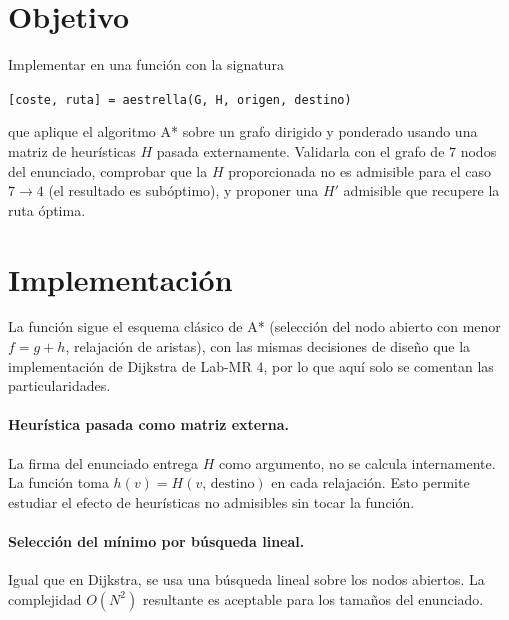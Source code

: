 \section{Objetivo}
Implementar en \matlab{} una funci\'{o}n con la signatura
\begin{center}
  \texttt{[coste, ruta] = aestrella(G, H, origen, destino)}
\end{center}
que aplique el algoritmo A* sobre un grafo dirigido y ponderado usando una matriz de heur\'{i}sticas $H$ pasada externamente. Validarla con el grafo de $7$ nodos del enunciado, comprobar que la $H$ proporcionada no es admisible para el caso $7\to 4$ (el resultado es sub\'{o}ptimo), y proponer una $H'$ admisible que recupere la ruta \'{o}ptima.


\section{Implementaci\'{o}n}

La funci\'{o}n sigue el esquema cl\'{a}sico de A* (selecci\'{o}n del nodo abierto con menor $f = g + h$, relajaci\'{o}n de aristas), con las mismas decisiones de dise\~{n}o que la implementaci\'{o}n de Dijkstra de Lab-MR 4, por lo que aqu\'{i} solo se comentan las particularidades.

\paragraph{Heur\'{i}stica pasada como matriz externa.} La firma del enunciado entrega $H$ como argumento, no se calcula internamente. La funci\'{o}n toma $h(v) = H(v,\,\text{destino})$ en cada relajaci\'{o}n. Esto permite estudiar el efecto de heur\'{i}sticas no admisibles sin tocar la funci\'{o}n.

\paragraph{Selecci\'{o}n del m\'{i}nimo por b\'{u}squeda lineal.} Igual que en Dijkstra, se usa una b\'{u}squeda lineal sobre los nodos abiertos. La complejidad $O(N^2)$ resultante es aceptable para los tama\~{n}os del enunciado.


